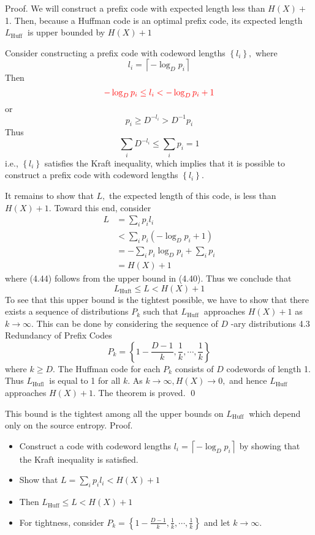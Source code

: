 \documentclass[8pt]{article}
\begin{document}
\noindent Proof. We will construct a prefix code with expected length less than $H(X)+$
1. Then, because a Huffman code is an optimal prefix code, its expected length $L_{\text {Huff }}$ is upper bounded by $H(X)+1$

Consider constructing a prefix code with codeword lengths $\left\{l_{i}\right\},$ where
$$
l_{i}=\left\lceil-\log _{D} p_{i}\right\rceil
$$
Then
$$
\color{red} -\log _{D} p_{i} \leq l_{i}<-\log _{D} p_{i}+1
$$
or
$$
p_{i} \geq D^{-l_{i}}>D^{-1} p_{i}
$$
Thus
$$
\sum_{i} D^{-l_{i}} \leq \sum_{i} p_{i}=1
$$
i.e., $\left\{l_{i}\right\}$ satisfies the Kraft inequality, which implies that it is possible to construct a prefix code with codeword lengths $\left\{l_{i}\right\}$.

It remains to show that $L,$ the expected length of this code, is less than $H(X)+1 .$ Toward this end, consider
$$
\begin{aligned}
L &=\sum_{i} p_{i} l_{i} \\
&<\sum_{i} p_{i}\left(-\log _{D} p_{i}+1\right) \\
&=-\sum_{i} p_{i} \log _{D} p_{i}+\sum_{i} p_{i} \\
&=H(X)+1
\end{aligned}
$$
where (4.44) follows from the upper bound in (4.40). Thus we conclude that
$$
L_{\mathrm{Huft}} \leq L<H(X)+1
$$
To see that this upper bound is the tightest possible, we have to show that there exists a sequence of distributions $P_{k}$ such that $L_{\text {Huff }}$ approaches $H(X)+1$ as $k \rightarrow \infty$. This can be done by considering the sequence of $D$ -ary distributions
4.3 Redundancy of Prefix Codes
$$
P_{k}=\left\{1-\frac{D-1}{k}, \frac{1}{k}, \cdots, \frac{1}{k}\right\}
$$
where $k \geq D$. The Huffman code for each $P_{k}$ consists of $D$ codewords of length
1. Thus $L_{\text {Hufl }}$ is equal to 1 for all $k$. As $k \rightarrow \infty, H(X) \rightarrow 0,$ and hence $L_{\text {Huff }}$ approaches $H(X)+1 .$ The theorem is proved. \qed


This bound is the tightest among all the upper bounds on $L_{\text {Huff }}$ which depend only on the source entropy.
Proof.
\begin{itemize}
	\item Construct a code with codeword lengths $l_{i}=\left\lceil-\log _{D} p_{i}\right\rceil$ by showing that the Kraft inequality is satisfied.
	\item Show that $L=\sum_{i} p_{i} l_{i}<H(X)+1$
	\item Then $L_{\mathrm{Huff}} \leq L<H(X)+1$
	\item For tightness, consider $P_{k}=\left\{1-\frac{D-1}{k}, \frac{1}{k}, \cdots, \frac{1}{k}\right\}$ and let $k \rightarrow \infty$.
\end{itemize}
\end{document}
